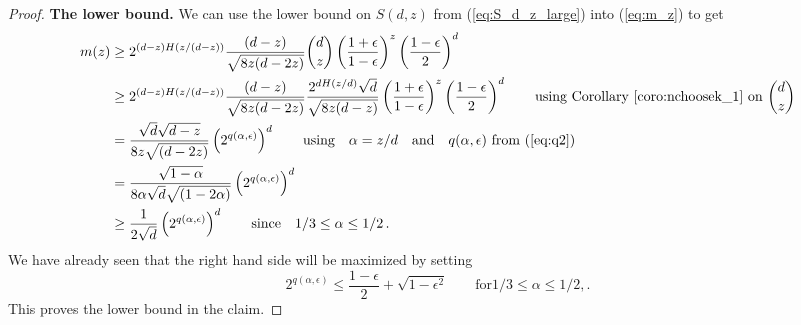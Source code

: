 \begin{proof}
\textbf{The lower bound.} We can use the lower bound on $S(d, z)$ from (\ref{eq:S_d_z_large}) into (\ref{eq:m_z}) to get
\begin{align*}
m(z) 
&\geq 2^{(d-z)H(z/(d- z))}\frac{(d-z)}{\sqrt{8z(d-2z)}} 
{d \choose z} \left(\frac{1+\epsilon}{1-\epsilon}\right)^{z} 
\left(\frac{1-\epsilon}{2}\right)^{d} \\
&\geq 2^{(d-z)H(z/(d- z))}\frac{(d-z)}{\sqrt{8z(d-2z)} } \frac{2^{d H(z/d)} \sqrt{d}}{\sqrt{8z(d-z)} }
\left(\frac{1+\epsilon}{1-\epsilon}\right)^{z} \left(\frac{1-\epsilon}{2}\right)^{d} \qquad \text{using Corollary~\ref{coro:nchoosek_1} on }{d \choose z}\\
&= \frac{\sqrt{d} \sqrt{d-z}}{8z\sqrt{(d-2z)} } 
\left( 2^{q(\alpha, \epsilon)}\right)^{d} \qquad \text{using}\quad \alpha = z/d \quad \text{and} \quad q(\alpha, \epsilon) \text{ from (\ref{eq:q2}) }\\
&= \frac{\sqrt{1-\alpha}}{8\alpha \sqrt{d} \sqrt{(1-2\alpha)} } 
\left( 2^{q(\alpha, \epsilon)}\right)^{d} \\
&\geq \frac{1}{2\sqrt{d}} 
\left( 2^{q(\alpha, \epsilon)}\right)^{d} \qquad \text{since}\quad 1/3 \leq \alpha \leq 1/2\, .
\end{align*}
We have already seen that the right hand side will be maximized by setting
\[
2^{q(\alpha, \epsilon)} \leq \frac{1-\epsilon}{2} + \sqrt{1-\epsilon^2} \qquad \text{for} 1/3 \leq \alpha \leq 1/2, .
\]
This proves the lower bound in the claim.
\end{proof}






